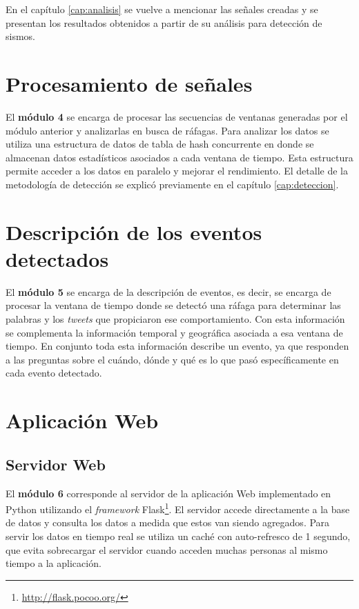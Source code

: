 En el capítulo \ref{cap:analisis} se vuelve a mencionar las señales creadas y se presentan los resultados obtenidos a partir de su análisis para detección de sismos.

\section{Procesamiento de señales}

El \textbf{módulo 4} se encarga de procesar las secuencias de ventanas generadas por el módulo anterior y analizarlas en busca de ráfagas.  
%
Para analizar los datos se utiliza una estructura de datos de tabla de hash concurrente en donde se almacenan datos estadísticos asociados a cada ventana de tiempo. Esta estructura permite acceder a los datos en paralelo y mejorar el rendimiento.
%
El detalle de la metodología de detección se explicó previamente en el capítulo \ref{cap:deteccion}.

\section{Descripción de los eventos detectados}

El \textbf{módulo 5} se encarga de la descripción de eventos, es decir, se encarga de procesar la ventana de tiempo donde se detectó una ráfaga para determinar las palabras y los \textit{tweets} que propiciaron ese comportamiento.
%
Con esta información se complementa la información temporal y geográfica asociada a esa ventana de tiempo.
%
En conjunto toda esta información describe un evento, ya que responden a las preguntas sobre el cuándo, dónde y qué es lo que pasó específicamente en cada evento detectado.


\section{Aplicación Web}

\subsection{Servidor Web}
El \textbf{módulo 6} corresponde al servidor de la aplicación Web implementado en Python utilizando el \textit{framework} Flask\footnote{\url{http://flask.pocoo.org/}}. El servidor accede directamente a la base de datos y consulta los datos a medida que estos van siendo agregados. Para servir los datos en tiempo real se utiliza un caché con auto-refresco de 1 segundo, que evita sobrecargar el servidor cuando acceden muchas personas al mismo tiempo a la aplicación. 


